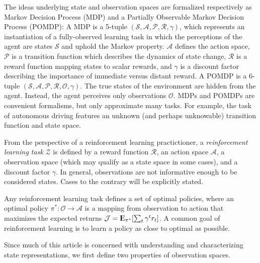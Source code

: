 \documentclass{article} %
\newcommand{\Expect}{{\rm I\kern-.3em E}}
\theoremstyle{definition}
\begin{document}
The ideas underlying state and observation spaces are formalized
respectively as Markov Decision Process (MDP) and a Partially
Observable Markov Decision Process (POMDP): A MDP is a 5-tuple
$(\mathcal{S}, \mathcal{A}, \mathcal{P}, \mathcal{R}, \gamma)$, which
represents an instantiation of a fully-observed learning task in which
the perceptions of the agent are states $\mathcal{S}$ and uphold the
Markov property. $\mathcal{A}$ defines the action space, $\mathcal{P}$
is a transition function which describes the dynamics of state change,
$\mathcal{R}$ is a reward function mapping states to scalar rewards,
and $\gamma$ is a discount factor describing the importance of
immediate versus distant reward. A POMDP is a 6-tuple $(\mathcal{S},
\mathcal{A}, \mathcal{P}, \mathcal{R}, \mathcal{O}, \gamma)$. The true
states of the environment are hidden from the agent. Instead, the
agent perceives only observations $\mathcal{O}$. MDPs and POMDPs are
convenient formalisms, but only approximate many tasks. For example,
the task of autonomous driving features an unknown (and perhaps
unknowable) transition function and state space.

From the perspective of a reinforcement learning practictioner, a
\textit{reinforcement learning task} $\mathcal{Z}$ is defined by a
reward function $\mathcal{R}$, an action space $\mathcal{A}$, a
observation space (which may qualify as a state space in some cases),
and a discount factor $\gamma$. In general, observations are not
informative enough to be considered states. Cases to the contrary will
be explicitly stated.

Any reinforcement learning task defines a set of optimal policies,
where an optimal policy $\pi^*: \mathcal{O} \rightarrow \mathcal{A}$
is a mapping from observation to action that maximizes the expected
returns $\mathcal{J} = \Expect_{\pi^*}[\sum_{t} \gamma^t r_t]$. A
common goal of reinforcement learning is to learn a policy as close to
optimal as possible.

Since much of this article is concerned with understanding and
characterizing state representations, we first define two properties
of observation spaces.
\end{document}
